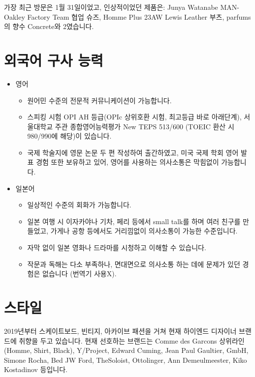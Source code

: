 가장 최근 방문은 1월 31일이었고, 인상적이었던 제품은: Junya Watanabe MAN-Oakley Factory Team 협업 슈즈, Homme Plus 23AW Lewis Leather 부츠, parfums의 향수 Concrete와 2였습니다.

\section*{외국어 구사 능력}
\begin{itemize}
    \item 영어
          \begin{itemize}
              \item 원어민 수준의 전문적 커뮤니케이션이 가능합니다.
              \item 스피킹 시험 OPI AH 등급(OPIc 상위호환 시험, 최고등급 바로 아래단계), 서울대학교 주관 종합영어능력평가 New TEPS 513/600 (TOEIC 환산 시 980/990에 해당)이 있습니다.
              \item 국제 학술지에 영문 논문 두 편 작성하여 출간하였고, 미국 국제 학회 영어 발표 경험 또한 보유하고 있어, 영어를 사용하는 의사소통은 막힘없이 가능합니다.
          \end{itemize}
    \item 일본어
          \begin{itemize}
              \item 일상적인 수준의 회화가 가능합니다.
              \item 일본 여행 시 이자카야나 기차, 페리 등에서 small talk를 하며 여러 친구를 만들었고, 가게나 공항 등에서도 거리낌없이 의사소통이 가능한 수준입니다.
              \item 자막 없이 일본 영화나 드라마를 시청하고 이해할 수 있습니다.
              \item 작문과 독해는 다소 부족하나, 면대면으로 의사소통 하는 데에 문제가 있던 경험은 없습니다 (번역기 사용X).
          \end{itemize}
\end{itemize}

\section*{스타일}
2019년부터 스케이트보드, 빈티지, 아카이브 패션을 거쳐 현재 하이엔드 디자이너 브랜드에 취향을 두고 있습니다.
현재 선호하는 브랜드는 Comme des Garcons 상위라인(Homme, Shirt, Black), Y/Project, Edward Cuming, Jean Paul Gaultier, GmbH, Simone Rocha, Bed JW Ford, TheSoloist, Ottolinger, Ann Demeulmeester, Kiko Kostadinov 등입니다.

